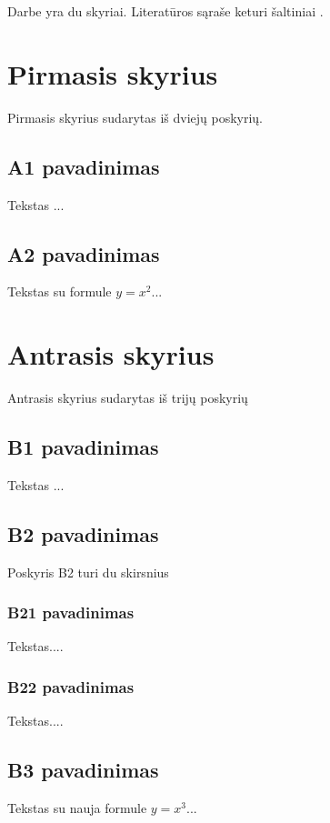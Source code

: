 \documentclass[a4paper,12pt]{article}
\begin{document}
Darbe yra du skyriai. Literatūros sąraše keturi šaltiniai \cite{BA}.  


\section{ Pirmasis skyrius}
Pirmasis skyrius sudarytas iš dviejų poskyrių. 
\subsection{A1 pavadinimas}
 Tekstas ...
 \subsection{A2 pavadinimas}
 Tekstas su formule $y=x^2$...
 
 
 \section{ Antrasis skyrius}
Antrasis skyrius sudarytas iš trijų poskyrių
\subsection{B1 pavadinimas}
 Tekstas ...
 \subsection{B2 pavadinimas}
 Poskyris B2 turi du skirsnius
 \subsubsection{B21 pavadinimas}
  Tekstas....
  \subsubsection{B22 pavadinimas}
  Tekstas....
 \subsection{B3 pavadinimas}
 Tekstas su nauja formule $y=x^3$...
 
\end{document}

